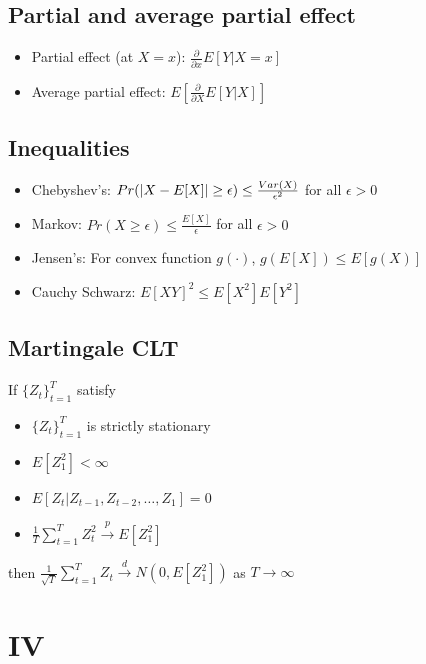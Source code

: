 \documentclass[10pt,landscape]{article}
\begin{document}
\begin{multicols}{3}
\subsection{Partial and average partial effect}
\begin{itemize}
  \item Partial effect (at $X = x$): $\frac{\partial}{\partial x} E[Y|X = x]$
  \item Average partial effect: $E[\frac{\partial}{\partial X} E[Y|X]]$
\end{itemize}

\subsection{Inequalities}
\begin{itemize}
  \item Chebyshev's: $Pr (\left| X - E[X] \right| \geq \epsilon) \leq \frac{Var(X)}{\epsilon^2}$ for all $\epsilon > 0$
  \item Markov: $Pr(X \geq \epsilon) \leq \frac{E[X]}{\epsilon}$ for all $\epsilon > 0$
  \item Jensen's: For convex function $g(\cdot)$, $g(E[X]) \leq E[g(X)]$
  \item Cauchy Schwarz: $E[XY]^2 \leq E[X^2] E[Y^2]$
\end{itemize}


\subsection{Martingale CLT}
If $\{ Z_t \}_{t=1}^T$ satisfy
\begin{itemize}
  \vspace{3pt}
  \item $\{ Z_t \}_{t=1}^T$ is strictly stationary
  \vspace{3pt}
  \item $E[Z_1^2] < \infty$
  \vspace{3pt}
  \item $E[Z_t | Z_{t-1}, Z_{t-2}, \ldots, Z_1] = 0$
  \vspace{2pt}
  \item $\frac{1}{T} \sum_{t=1}^T Z_t^2 \xrightarrow{p} E[Z_1^2]$
\end{itemize}
then $\frac{1}{\sqrt{T}} \sum_{t=1}^T Z_t \xrightarrow{d} N(0, E[Z_1^2])$ as $T \rightarrow \infty$


\section{IV}


\end{multicols}
\end{document}
